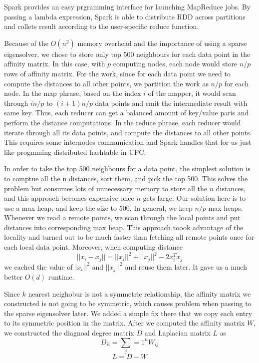 \documentclass{acm_proc_article-sp}
\begin{document}
Spark provides an easy prgramming interface for launching MapReduce jobs. By passing a lambda expression, Spark is able to distribute RDD across partitions and collets result according to the user-specific reduce function. 

Because of the $O(n^2)$ memory overhead and the importance of using a sparse eigensolver, we chose to store only top 500 neighbours for each data point in the affinity matrix. In this case, with $p$ computing nodes, each node would store $n/p$ rows of affinity matrix. For the work, since for each data point we need to compute the distances to all other points, we partition the work as $n/p$ for each node. In the map phrase, based on the index $i$ of the mapper, it would scan through $in/p$ to $(i+1)n/p$ data points and emit the intermediate result with same key. Thus, each reducer can get a balanced amount of key/value paris and perform the distance computations. In the reduce phrase, each reducer would iterate through all its data points, and compute the distances to all other points. This requires some internodes communication and Spark handles that for us just like progmming distributed hashtable in UPC.

In order to take the top 500 neighbours for a data point, the simplest solution is to comptue all the n distances, sort them, and pick the top 500. This solves the problem but consumes lots of unnecessary memory to store all the $n$ distances, and this approach becomes expensive once $n$ gets large. Our solution here is to use a max heap, and keep the size to 500. In general, we keep $n/p$ max heaps. Whenever we read a remote points, we scan through the local points and put distances into corresponding max heap. This approach toook advantage of the locality and turned out to be much faster than fetching all remote points once for each local data point. Moreover, when computing distance $$||x_i - x_j|| = ||x_i||^2 + ||x_j||^2 - 2x_i^Tx_j$$
we cached the value of $|x_i||^2$ and $||x_j||^2$ and reuse them later. It gave us a much better $O(d)$ runtime. 

Since $k$ nearest neighobur is not a symmetric relationship, the affinity matrix we constructed is not going to be symmetric, which causes problem when passing to the sparse eigensolver later. We added a simple fix there that we copy each entry to its symmetric position in the matrix. After we computed the affinity matrix $W$, we constructed the diagnoal degree matrix $D$ and Laplacian matrix $L$ as 
$$ D_{ii} = \sum_j=1^nW_{ij}$$
$$ L = D - W$$
\end{document}
